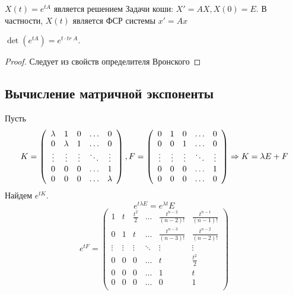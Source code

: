\begin{corollary}
    \(X(t) = e^{tA}\) является решением Задачи коши: \(X' = AX, X(0) = E\). В частности, \(X(t)\) является ФСР системы \(x' = Ax\)
\end{corollary}

\begin{proposition}
    \(\det(e^{tA}) = e^{t \cdot tr\;A}\).
\end{proposition}
\begin{proof}
    Следует из свойств определителя Вронского
\end{proof}

\subsection{Вычисление матричной экспоненты}
Пусть
\[K = \left( \begin{array}{ccccc}
    \lambda & 1 & 0 & \dots & 0 \\
    0 & \lambda & 1 & \dots & 0 \\
    \vdots & \vdots & \vdots & \ddots & \vdots \\
    0 & 0 & 0 & \dots & 1 \\
    0 & 0 & 0 & \dots & \lambda \\
\end{array} \right), F = \left( \begin{array}{ccccc}
    0 & 1 & 0 & \dots & 0 \\
    0 & 0 & 1 & \dots & 0 \\
    \vdots & \vdots & \vdots & \ddots & \vdots \\
    0 & 0 & 0 & \dots & 1 \\
    0 & 0 & 0 & \dots & 0 \\
\end{array} \right) \Rightarrow K = \lambda E + F\]
Найдем \(e^{tK}\).
\[e^{t\lambda E} = e^{\lambda t}E\]
\[e^{tF} = \left( \begin{array}{cccccc}
    1 & t & \frac{t^2}{2} & \dots & \frac{t^{n - 2}}{(n - 2)!} & \frac{t^{n - 1}}{(n - 1)!} \\
    0 & 1 & t & \dots & \frac{t^{n - 3}}{(n - 3)!} & \frac{t^{n - 2}}{(n - 2)!} \\
    
    \vdots & \vdots & \vdots & \ddots & \vdots &\vdots \\
    0 & 0 & 0 & \dots & t & \frac{t^2}{2} \\
    0 & 0 & 0 & \dots & 1 & t \\
    0 & 0 & 0 & \dots & 0 & 1 \\
\end{array} \right)\]

